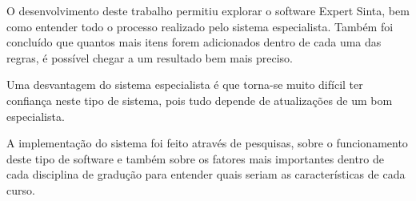 

O desenvolvimento deste trabalho permitiu explorar o software Expert Sinta, bem como entender todo o processo realizado pelo sistema especialista. Também foi concluído que quantos mais itens forem adicionados dentro de cada uma das regras, é possível chegar a um resultado bem mais preciso. 

Uma desvantagem do sistema especialista é que torna-se muito difícil ter confiança neste tipo de sistema, pois tudo depende de atualizações de um bom especialista.

A implementação do sistema foi feito através de pesquisas, sobre o funcionamento deste tipo de software e também sobre os fatores mais importantes dentro de cada disciplina de gradução para entender quais seriam as características de cada curso.

